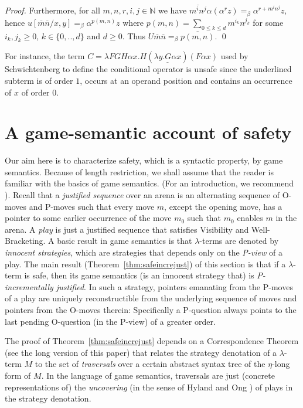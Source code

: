 \documentclass{llncs}
\newcommand{\encode}[1]{\overline{#1}} \newcommand\dps{\displaystyle}
\newcommand\nat{\mathbb{N}}
\begin{document}
\begin{proof}
Furthermore, for all $m,n,r,i,j\in \nat$
we have $\encode{m^i n^j} \alpha (\alpha^r z) =_\beta
\alpha^{r + m^i n^j} z$,
hence $u[\encode{m} \encode{n}/x,y] =_\beta \alpha^{p(m,n)} z$ where $p(m,n) = \sum_{0\leq k \leq d} m^{i_k} n^{j_k}$ for some $i_k,j_k \geq 0$, $k \in\{ 0,..,d \}$ and $d\geq 0$.
Thus $U \encode{m} \encode{n} =_\beta \encode{p(m,n)}$. \qed
\end{proof}

For instance, the term $ C = \lambda F G H \alpha x . H (
\underline{\lambda y . G \alpha x} ) (F \alpha x)$ used by
Schwichtenberg \cite{citeulike:622637} to define the conditional
operator is unsafe since the underlined subterm is of order $1$,
occurs at an operand position and contains an occurrence of $x$ of
order $0$.


\section{A game-semantic account of safety}
\label{sec:gamesemaccount}
Our aim here is to characterize safety, which is a syntactic property,
by game semantics. Because of length restriction, we shall assume that
the reader is familiar with the basics of game semantics.  (For an
introduction, we recommend \cite{abramsky:game-semantics-tutorial}). Recall that a \emph{justified sequence} over
an arena is an alternating sequence of O-moves and P-moves such that
every move $m$, except the opening move, has a pointer to some earlier
occurrence of the move $m_0$ such that $m_0$ enables $m$ in the
arena. A \emph{play} is just a justified sequence that satisfies
Visibility and Well-Bracketing. A basic result in game semantics is
that $\lambda$-terms are denoted by \emph{innocent strategies}, which
are strategies that depends only on the \emph{P-view} of a play. The
main result (Theorem~\ref{thm:safeincrejust}) of this section is that
if a $\lambda$-term is safe, then its game semantics (is an innocent
strategy that) is \emph{P-incrementally justified}. In such a
strategy, pointers emanating from the P-moves of a play are uniquely
reconstructible from the underlying sequence of moves and pointers
from the O-moves therein: Specifically a P-question always
points to the last pending O-question (in the P-view) of a greater
order.

The proof of Theorem~\ref{thm:safeincrejust} depends on a
Correspondence Theorem (see the long version of this paper) that relates the strategy denotation of a $\lambda$-term $M$
to the set of \emph{traversals} over a certain abstract syntax tree of
the $\eta$-long form of $M$. In the language of game semantics,
traversals are just (concrete representations of) the
\emph{uncovering} (in the sense of Hyland and Ong
\cite{hylandong_pcf}) of plays in the strategy denotation.
\end{document}
